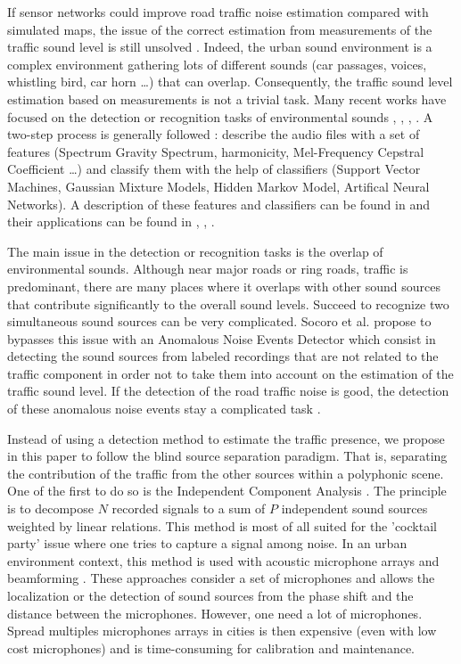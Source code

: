 \documentclass[twocolumn,a4paper,10pt]{article}
\begin{document}
If sensor networks could improve road traffic noise estimation compared with simulated maps, the issue of the correct estimation from  measurements of the traffic sound level is still unsolved \cite{Mioduszewski}. Indeed, the urban sound environment is a complex environment gathering lots of different sounds (car passages, voices, whistling bird, car horn \dots) that can overlap. Consequently, the traffic sound level estimation based on measurements is not a trivial task.
Many recent works have focused on the detection or recognition tasks of environmental sounds \cite{heittola_sound_2011}, \cite{defreville_automatic_2006}, \cite{dufaux_automatic_2000}, \cite{chu_environmental_2009}. A two-step process is generally followed : describe the audio files with a set of features (Spectrum Gravity Spectrum, harmonicity, Mel-Frequency Cepstral Coefficient \dots) and classify them with the help of classifiers (Support Vector Machines, Gaussian Mixture Models, Hidden Markov Model, Artifical Neural Networks). A description of these features and classifiers can be found in \cite{cowling_comparison_2003} and their applications can be found in \cite{shen_environmental_2012}, \cite{beritelli_pattern_2008}, \cite{couvreur_automatic_2004}.

The main issue in the detection or recognition tasks is the overlap of environmental sounds. Although near major roads or ring roads, traffic is predominant, there are many places where it overlaps with other sound sources that contribute significantly to the overall sound levels. Succeed to recognize two simultaneous sound sources can be very complicated. Socoro et al. propose to bypasses this issue with an Anomalous Noise Events Detector \cite{socoro_anomalous_2017} which consist in detecting the sound sources from labeled recordings that are not related to the traffic component in order not to take them into account on the estimation of the traffic sound level. If the detection of the road traffic noise is good, the detection of these anomalous noise events stay a complicated task \cite{stowell2015detection}.

Instead of using a detection method to estimate the traffic presence, we propose in this paper to follow the blind source separation paradigm. That is, separating the contribution of the traffic from the other sources within a polyphonic scene. \\

One of the first to do so is the Independent Component Analysis \cite{comon_independent_1994}. The principle is to decompose $N$ recorded signals to a sum of $P$ independent sound sources weighted by linear relations. This method is most of all suited for the 'cocktail party' issue where one tries to capture a signal among noise. In an urban environment context, this method is used with acoustic microphone arrays and beamforming \cite{saruwatari2003blind}. These approaches consider a set of microphones and allows the localization \cite{mennitt2010multiple} or the detection \cite{leiba2017large} of sound sources from the phase shift and the distance between the microphones. However, one need a lot of microphones. Spread multiples microphones arrays in cities is then expensive (even with low cost microphones) and is time-consuming for calibration and maintenance.
\end{document}
